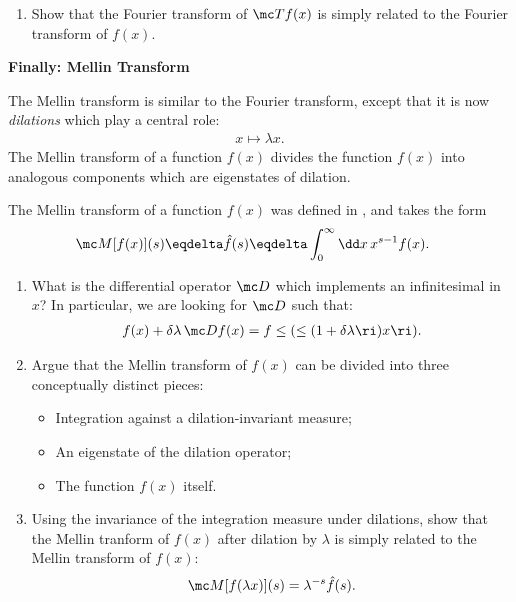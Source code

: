 {\begin{enumerate}[label=\roman*)]
        \item
            Show that the Fourier transform of \(\mc T f(x)\) is simply related to the Fourier transform of \(f(x)\).
    \end{enumerate}

    \vspace{.5cm}

    \textbf{Finally: Mellin Transform}

    The Mellin transform is similar to the Fourier transform, except that it is now \emph{dilations} which play a central role:
    \begin{align}
        x \mapsto \lambda x
        .
    \end{align}
    The Mellin transform of a function \(f(x)\) divides the function \(f(x)\) into analogous components which are eigenstates of dilation.

    The Mellin transform of a function \(f(x)\) was defined in , and takes the form
    \begin{align}
        \mc M[f(x)](s)
        \eqdelta
        \hat f(s)
        &\eqdelta
        \int_0^\infty \dd x \, x^{s-1} f(x)
        .
    \end{align}

    \begin{enumerate}[label=\roman*)]
        \item
            What is the differential operator \(\mc D\) which implements an infinitesimal  in \(x\)?
            In particular, we are looking for \(\mc D\) such that:
            \begin{align}
                f(x) + \delta \lambda \, \mc D f(x)
                =
                f\le(\le(1 + \delta \lambda\ri)x\ri)
                .
            \end{align}

        \item
            Argue that the Mellin transform of \(f(x)\) can be divided into three conceptually distinct pieces:
            \begin{itemize}
                \item
                    Integration against a dilation-invariant measure;

                \item
                    An eigenstate of the dilation operator;

                \item
                    The function \(f(x)\) itself.
            \end{itemize}

        \item
            Using the invariance of the integration measure under dilations, show that the Mellin tranform of \(f(x)\) after dilation by \(\lambda\) is simply related to the Mellin transform of \(f(x)\):
            \begin{align}
                \mc M[f(\lambda x)](s) = \lambda^{-s} \hat f(s)
                .
            \end{align}
    \end{enumerate}
}



